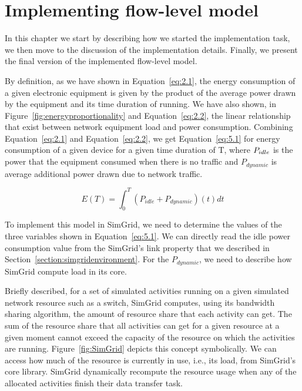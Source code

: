 \chapter{Implementing flow-level model}
\label{chapter:implementation}

In this chapter we start by describing how we started the implementation task, we then move to the discussion of the implementation details. Finally, we present the final version of the implemented flow-level model. 

By definition, as we have shown in Equation~\ref{eq:2.1}, the energy consumption of a given electronic equipment is given by the product of the average power drawn by the equipment and its time duration of running. We have also shown, in Figure~\ref{fig:energyproportionality} and Equation~\ref{eq:2.2}, the linear relationship that exist between network equipment load and power consumption. Combining Equation~\ref{eq:2.1} and Equation~\ref{eq:2.2}, we get Equation~\ref{eq:5.1} for energy consumption of a given device for a given time duration of T, where \($$P_{idle}$$\) is the power that the equipment consumed when there is no traffic and \(P_{dynamic}\) is average additional power drawn due to network traffic.

\begin{equation} \label{eq:5.1}
E(T) =  \int_{0}^{T} (P_{idle} + P_{dynamic})(t) dt 
\end{equation} 

To implement this model in SimGrid, we need to determine the values of the three variables shown in Equation~\ref{eq:5.1}. We can directly read the idle power consumption value from the SimGrid's link property that we described in Section~\ref{section:simgridenvironment}. For the \(P_{dynamic}\), we need to describe how SimGrid compute load in its core. 

Briefly described, for a set of simulated activities running on a given simulated network resource such as a switch, SimGrid computes, using its bandwidth sharing algorithm, the amount of resource share that each activity can get. The sum of the resource share that all activities can get for a given resource at a given moment cannot exceed the capacity of the resource on which the activities are running. Figure~\ref{fig:SimGrid} depicts this concept symbolically. We can access how much of the resource is currently in use, i.e., its load, from SimGrid's core library. SimGrid dynamically recompute the resource usage when any of the allocated activities finish their data transfer task. 

